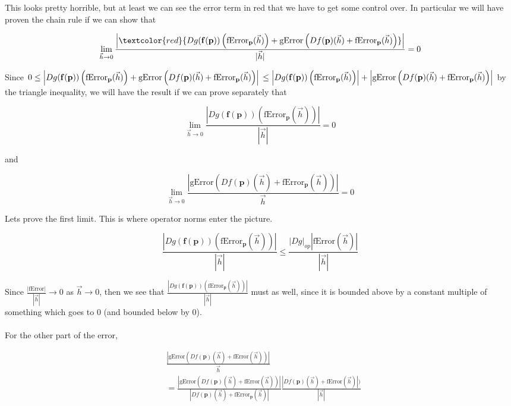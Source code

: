 \documentclass{ximera}
\begin{document}
	This looks pretty horrible, but at least we can see the error term in red that we have to get some control over.  
	In particular we will have proven the chain rule if we can show that
	
	\[
		\lim_{\vec{h} \to 0} \frac{\left|\textcolor{red}{Dg(\mathbf{f(p)})\left(\text{fError}_{\mathbf{p}}(\vec{h})\right) + \text{gError}\left(Df(\mathbf{p})(\vec{h})+\text{fError}_{\mathbf{p}}(\vec{h})\right)}\right|}{|\vec{h}|} = 0
	\]
	
	Since $0 \leq \left|Dg(\mathbf{f(p)})\left(\text{fError}_{\mathbf{p}}(\vec{h})\right) + \text{gError}\left(Df(\mathbf{p})(\vec{h})+\text{fError}_{\mathbf{p}}(\vec{h})\right) \right|\\\\ \leq \left|Dg(\mathbf{f(p)})\left(\text{fError}_{\mathbf{p}}(\vec{h})\right)\right| + \left| \text{gError}\left(Df(\mathbf{p})(\vec{h})+\text{fError}_{\mathbf{p}}(\vec{h})\right)\right|$
	by the triangle inequality, we will have the result if we can prove separately that
	
	\[
		\lim_{\vec{h} \to 0} \frac{\left|Dg(\mathbf{f(p)})\left(\text{fError}_{\mathbf{p}}(\vec{h})\right)\right|}{\left|\vec{h}\right|}  = 0
	\]
	
	and 
	
	\[
	\lim_{\vec{h} \to 0} \frac{ \left| \text{gError}\left(Df(\mathbf{p})(\vec{h})+\text{fError}_{\mathbf{p}}(\vec{h})\right)\right|}{\vec{h}} = 0
	\]
	
	Lets prove the first limit.  This is where operator norms enter the picture.
	
\[
	\frac{\left|Dg(\mathbf{f(p)})\left(\text{fError}_{\mathbf{p}}(\vec{h})\right)\right|}{\left|\vec{h}\right|} \leq \frac{\left|Dg\right|_{op}|\text{fError}(\vec{h})|}{|\vec{h}|}
\]

Since $\frac{\left|\text{fError}\right|}{\left|\vec{h}\right|} \to 0$ as $\vec{h} \to 0$, then we see that $\frac{\left|Dg(\mathbf{f(p)})\left(\text{fError}_{\mathbf{p}}(\vec{h})\right)\right|}{\left|\vec{h}\right|}$ 
must as well, since it is bounded above by a constant multiple of something which goes to $0$ (and bounded below by $0$).
\\
\\
For the other part of the error,

\begin{align*}
& \frac{ \left| \text{gError}\left(Df(\mathbf{p})(\vec{h})+\text{fError}(\vec{h})\right)\right|}{\vec{h}}\\
&=\frac{\left| \text{gError}\left(Df(\mathbf{p})(\vec{h})+\text{fError}(\vec{h})\right)\right|}{\left|Df(\mathbf{p})(\vec{h})+\text{fError}_{\mathbf{p}}(\vec{h})\right|} \frac{\left|Df(\mathbf{p})(\vec{h})+\text{fError}(\vec{h})\right|)}{|\vec{h}|}\\
\end{align*}
\end{document}

